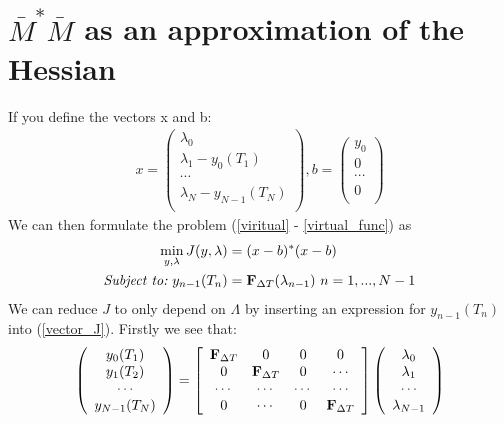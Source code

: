 \documentclass[11pt,a4paper]{article}
\begin{document}
\section{$\bar{M}^{*}\bar{M}$ as an approximation of the Hessian}
If you define the vectors x and b:
\begin{align}
x= \left( \begin{array}{c}
   \lambda_0 \\  
   \lambda_1 - y_0(T_1) \\ 
   \cdots  \\
   \lambda_N -y_{N-1}(T_N)  \\
   \end{array}  \right),
b = \left( \begin{array}{c}
   y_0 \\  
   0\\ 
   \cdots  \\
   0  \\
   \end{array}  \right)
\end{align} 
We can then formulate the problem (\ref{viritual} - \ref{virtual_func}) as 
\begin{align}
\min_{y,\lambda} J(y,\lambda) &= (x-b)^*(x-b) \label{vector_J}\\ 
\textit{Subject to:} \ y_{n-1}(T_n) &= \bold{F}_{\Delta T}(\lambda_{n-1}) \ n =1,...,N-1 
\end{align}
We can reduce $J$ to only depend on $\Lambda$ by inserting an expression for $y_{n-1}(T_n)$ into (\ref{vector_J}). Firstly we see that:
\begin{align}
\left( \begin{array}{c}
   y_0(T_1) \\  
   y_1(T_2) \\ 
   \cdots  \\
   y_{N-1}(T_N)  \\
   \end{array}  \right)= 
   \left[ \begin{array}{cccc}  
   \bold{F}_{\Delta T} & 0 & 0 & 0 \\ 
   0 &\bold{F}_{\Delta T} & 0  & \cdots \\
   \cdots & \cdots & \cdots & \cdots \\
   0 &\cdots &0 & \bold{F}_{\Delta T}   \\
   \end{array}  \right]
   \left( \begin{array}{c}
   \lambda_0 \\  
   \lambda_1 \\ 
   \cdots  \\
   \lambda_{N-1}  \\
   \end{array}  \right)
\end{align}
\end{document}
